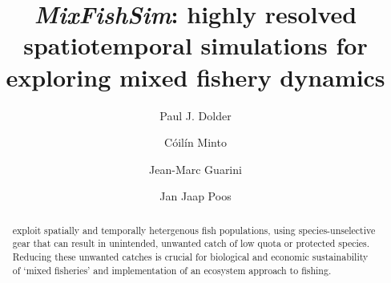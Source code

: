 \documentclass[review]{elsarticle}
\begin{document}
\begin{frontmatter}
\title{\emph{MixFishSim}: highly resolved spatiotemporal simulations for
	exploring mixed fishery dynamics}


\author[1,2]{Paul J. Dolder}

\author[1]{Cóilín Minto}
\author[3]{Jean-Marc Guarini}
\author[4]{Jan Jaap Poos}

\address[1]{Galway-Mayo Institute of Technology (GMIT), Dublin Road, Galway,
	Ireland} 
\address[2]{Centre for Environment, Fisheries and Aquaculture Science (Cefas),
	Pakefield Road, Lowestoft, UK}
\address[3]{, 4 Place Jussieu,
	75005 Paris, France}
\address[4]{Wageningen Marine Research, Haringkade 1 1976 CP IJmuiden,
	Netherlands}

\begin{abstract}
%
 exploit spatially
and temporally hetergenous fish populations, using species-unselective gear
that can result in unintended, unwanted catch of low quota or protected
species. Reducing these unwanted catches is crucial for biological and economic
sustainability of `mixed fisheries' and implementation of an ecosystem approach
to fishing. \\


\end{abstract}
\end{frontmatter}
\end{document}

